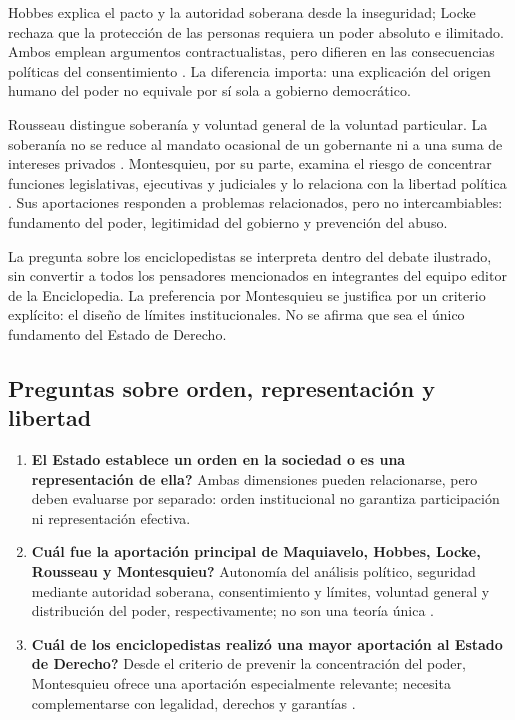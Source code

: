 \documentclass[12pt,spanish,letterpaper,oneside]{article}
\begin{document}
Hobbes explica el pacto y la autoridad soberana desde la inseguridad;
Locke rechaza que la protecci\'on de las personas requiera un poder absoluto
e ilimitado. Ambos emplean argumentos contractualistas, pero difieren
en las consecuencias pol\'iticas del consentimiento
\citep[pp.~161--164]{andradeS4}. La diferencia importa: una explicaci\'on
del origen humano del poder no equivale por s\'i sola a gobierno democr\'atico.

Rousseau distingue soberan\'ia y voluntad general de la voluntad particular.
La soberan\'ia no se reduce al mandato ocasional de un gobernante ni a
una suma de intereses privados \citep[libro II, caps.~1--2]{rousseauS4}.
Montesquieu, por su parte, examina el riesgo de concentrar funciones
legislativas, ejecutivas y judiciales y lo relaciona con la libertad
pol\'itica \citep[libro XI, cap.~6]{montesquieuS4}. Sus aportaciones
responden a problemas relacionados, pero no intercambiables: fundamento
del poder, legitimidad del gobierno y prevenci\'on del abuso.

La pregunta sobre los enciclopedistas se interpreta dentro del debate
ilustrado, sin convertir a todos los pensadores mencionados en integrantes
del equipo editor de la Enciclopedia. La preferencia por Montesquieu
se justifica por un criterio expl\'icito: el dise\~no de l\'imites institucionales.
No se afirma que sea el \'unico fundamento del Estado de Derecho.

\subsection{Preguntas sobre orden, representaci\'on y libertad}
\begin{enumerate}
\item \textbf{\textquestiondown El Estado establece un orden en la sociedad o es una representaci\'on de ella?}
Ambas dimensiones pueden relacionarse, pero deben evaluarse por separado:
orden institucional no garantiza participaci\'on ni representaci\'on efectiva.
\item \textbf{\textquestiondown Cu\'al fue la aportaci\'on principal de Maquiavelo, Hobbes, Locke, Rousseau y Montesquieu?}
Autonom\'ia del an\'alisis pol\'itico, seguridad mediante autoridad soberana,
consentimiento y l\'imites, voluntad general y distribuci\'on del poder,
respectivamente; no son una teor\'ia \'unica \citep{andradeS4,rousseauS4,montesquieuS4}.
\item \textbf{\textquestiondown Cu\'al de los enciclopedistas realiz\'o una mayor aportaci\'on al Estado de Derecho?}
Desde el criterio de prevenir la concentraci\'on del poder, Montesquieu
ofrece una aportaci\'on especialmente relevante; necesita complementarse
con legalidad, derechos y garant\'ias \citep[p.~21]{ricciS4}.
\end{enumerate}
\end{document}
